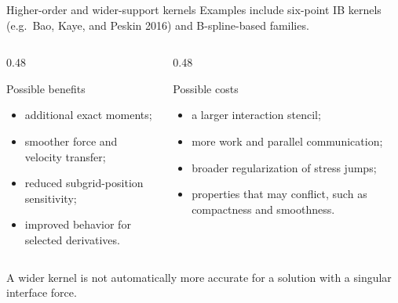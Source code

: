 \documentclass[aspectratio=169,11pt]{beamer}
\begin{document}
\begin{frame}{Higher-order and wider-support kernels}
Examples include six-point IB kernels (e.g.\ Bao, Kaye, and Peskin 2016) and B-spline-based families.

\begin{columns}[T,onlytextwidth]
  \begin{column}{0.48\textwidth}
  \begin{block}{Possible benefits}
  \begin{itemize}
    \item additional exact moments;
    \item smoother force and velocity transfer;
    \item reduced subgrid-position sensitivity;
    \item improved behavior for selected derivatives.
  \end{itemize}
  \end{block}
  \end{column}
  \begin{column}{0.48\textwidth}
  \begin{block}{Possible costs}
  \begin{itemize}
    \item a larger interaction stencil;
    \item more work and parallel communication;
    \item broader regularization of stress jumps;
    \item properties that may conflict, such as compactness and smoothness.
  \end{itemize}
  \end{block}
  \end{column}
\end{columns}

\begin{punchbox}
A wider kernel is not automatically more accurate for a solution with a singular interface force.
\end{punchbox}
\end{frame}
\end{document}
